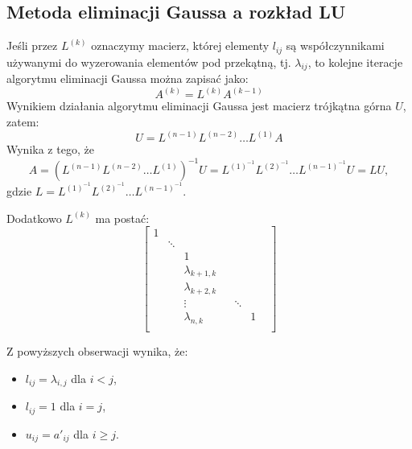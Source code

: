 \documentclass{article}
\begin{document}
\subsection{Metoda eliminacji Gaussa a rozkład LU}
Jeśli przez $L^{(k)}$ oznaczymy macierz, której elementy $l_{ij}$ są współczynnikami używanymi do wyzerowania elementów pod przekątną, tj. $\lambda_{ij}$, to kolejne iteracje algorytmu eliminacji Gaussa można zapisać jako:
$$
A^{(k)} = L^{(k)} A^{(k-1)}
$$
Wynikiem działania algorytmu eliminacji Gaussa jest macierz trójkątna górna $U$, zatem:
$$
U = L^{(n-1)} L^{(n-2)} \dots L^{(1)} A
$$
Wynika z tego, że
$$
A = (L^{(n-1)} L^{(n-2)} \dots L^{(1)})^{-1} U = L^{(1)^{-1}} L^{(2)^{-1}} \dots L^{(n-1)^{-1}} U = LU,
$$
gdzie $L = L^{(1)^{-1}} L^{(2)^{-1}} \dots L^{(n-1)^{-1}}$.

Dodatkowo $L^{(k)}$ ma postać:
$$
\begin{bmatrix}
    1 & & & & & & \\
    & \ddots & & & & \\
    & & 1 & & & & \\
    & & \lambda_{k+1,k} &  & \\
    & & \lambda_{k+2,k} & & & \\
    & & \vdots & & \ddots & & \\
    & & \lambda_{n,k} & & & 1 \\
\end{bmatrix}
$$

Z powyższych obserwacji wynika, że:
\begin{itemize}
    \item $l_{ij} = \lambda_{i,j}$ dla $i < j$,
    \item $l_{ij} = 1$ dla $i = j$,
    \item $u_{ij} = a'_{ij}$ dla $i \geq j$.
\end{itemize}
\end{document}
